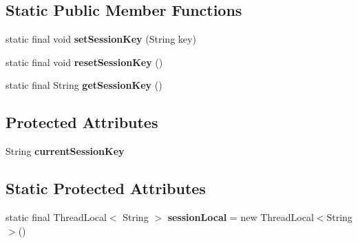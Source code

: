\subsection*{Static Public Member Functions}
\begin{DoxyCompactItemize}
\item 
\mbox{\label{classcom_1_1mysql_1_1jdbc_1_1interceptors_1_1_session_association_interceptor_a8a8e875bdc118c2f4f0bb968aa7a2a85}} 
static final void {\bfseries set\+Session\+Key} (String key)
\item 
\mbox{\label{classcom_1_1mysql_1_1jdbc_1_1interceptors_1_1_session_association_interceptor_a6aeabb72a4c8eff857d6d23d0b9f7fba}} 
static final void {\bfseries reset\+Session\+Key} ()
\item 
\mbox{\label{classcom_1_1mysql_1_1jdbc_1_1interceptors_1_1_session_association_interceptor_a4bc89da992525d76a446324486896817}} 
static final String {\bfseries get\+Session\+Key} ()
\end{DoxyCompactItemize}
\subsection*{Protected Attributes}
\begin{DoxyCompactItemize}
\item 
\mbox{\label{classcom_1_1mysql_1_1jdbc_1_1interceptors_1_1_session_association_interceptor_a3eac464f29da3ea9c3e5e1c27e8d5e2d}} 
String {\bfseries current\+Session\+Key}
\end{DoxyCompactItemize}
\subsection*{Static Protected Attributes}
\begin{DoxyCompactItemize}
\item 
\mbox{\label{classcom_1_1mysql_1_1jdbc_1_1interceptors_1_1_session_association_interceptor_a0c944b02cf28fc6c4faa58e118db0760}} 
static final Thread\+Local$<$ String $>$ {\bfseries session\+Local} = new Thread\+Local$<$String$>$()
\end{DoxyCompactItemize}


